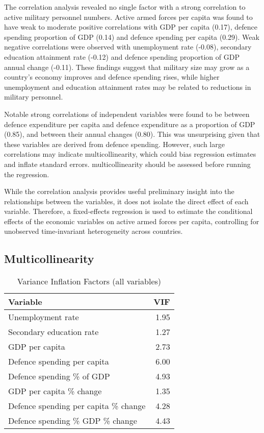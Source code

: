 The correlation analysis revealed no single factor with a strong correlation to active military personnel numbers.
Active armed forces per capita was found to have weak to moderate positive correlations with GDP per 
capita (0.17), defence spending proportion of GDP (0.14) and defence spending per capita (0.29).
Weak negative correlations were observed with unemployment rate
(-0.08), secondary education attainment rate (-0.12) and defence spending proportion of GDP annual 
change (-0.11). These findings suggest that military size may grow as a country's economy improves 
and defence spending rises, while higher unemployment and education attainment rates may be related 
to reductions in military personnel.

Notable strong correlations of independent variables were found to be between defence expenditure per capita and 
defence expenditure as a proportion of GDP (0.85), and between their annual changes (0.80). 
This was unsurprising given that these variables are derived from defence spending. 
However, such large correlations may indicate multicollinearity, which could 
bias regression estimates and inflate standard errors. multicollinearity should be 
assessed before running the regression.

While the correlation analysis provides useful preliminary insight into the relationships between 
the variables, it does not isolate the direct effect of each variable. Therefore, a 
fixed-effects regression is used to estimate the conditional effects of the economic variables 
on active armed forces per capita, controlling for unobserved time-invariant heterogeneity 
across countries.

\subsection{Multicollinearity}

\begin{table}[ht]
\caption{Variance Inflation Factors (all variables)}
\small
\centering
\begin{tabularx}{\textwidth}{l r}
\toprule
\textbf{Variable} & \textbf{VIF} \\
\midrule
Unemployment rate & 1.95 \\
Secondary education rate & 1.27 \\
GDP per capita & 2.73 \\
Defence spending per capita & 6.00 \\
Defence spending \% of GDP & 4.93 \\
GDP per capita \% change & 1.35 \\
Defence spending per capita \% change & 4.28 \\
Defence spending \% GDP \% change & 4.43 \\
\bottomrule
\end{tabularx}
\label{tab:multicollinearity_full}
\end{table}

